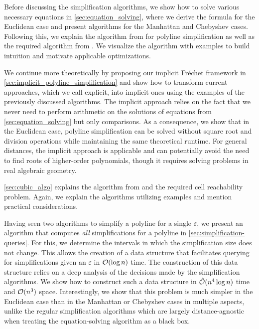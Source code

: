 Before discussing the simplification algorithms, we show how to solve various necessary equations in \cref{sec:equation_solving}, where we derive the formula for the Euclidean case and present algorithms for the Manhattan and Chebyshev cases. Following this, we explain the algorithm from \citeauthor{on_optimal_polyline_simplification_using_the_hausdorff_and_frechet_distance} for polyline simplification as well as the required algorithm from \citeauthor{computing_the_frechet_distance_between_two_polygonal_curves}. We visualize the algorithm with examples to build intuition and motivate applicable optimizations.

We continue more theoretically by proposing our implicit Fréchet framework in \cref{sec:implicit_polyline_simplification} and show how to transform current approaches, which we call explicit, into implicit ones using the examples of the previously discussed algorithms. The implicit approach relies on the fact that we never need to perform arithmetic on the solutions of equations from \cref{sec:equation_solving} but only comparisons. As a consequence, we show that in the Euclidean case, polyline simplification can be solved without square root and division operations while maintaining the same theoretical runtime. For general distances, the implicit approach is applicable and can potentially avoid the need to find roots of higher-order polynomials, though it requires solving problems in real algebraic geometry.

\cref{sec:cubic_algo} explains the algorithm from \citeauthor{polyline_simplification_has_cubic_complexity_bringmannetal} and the required cell reachability problem. Again, we explain the algorithms utilizing examples and mention practical considerations.

Having seen two algorithms to simplify a polyline for a single \(\varepsilon\), we present an algorithm that computes \emph{all} simplifications for a polyline in \cref{sec:simplification-queries}. For this, we determine the intervals in which the simplification size does not change. This allows the creation of a data structure that facilitates querying for simplifications given an \(\varepsilon\) in \(\mathcal{O}(\log n)\) time. The construction of this data structure relies on a deep analysis of the decisions made by the simplification algorithms. We show how to construct such a data structure in \(\hat{\mathcal{O}}(n^4 \log n)\) time and \(\mathcal{O}(n^3)\) space. Interestingly, we show that this problem is much simpler in the Euclidean case than in the Manhattan or Chebyshev cases in multiple aspects, unlike the regular simplification algorithms which are largely distance-agnostic when treating the equation-solving algorithm as a black box.

